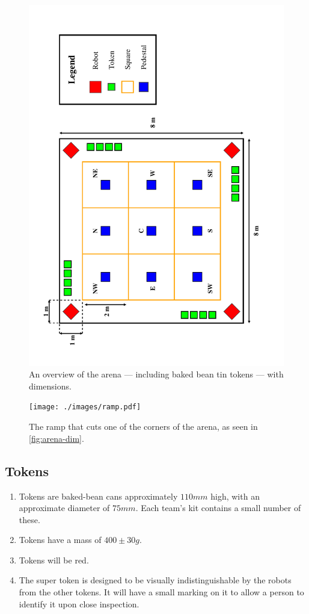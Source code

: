 \begin{figure}
  \includegraphics[keepaspectratio, clip, width=\textwidth]{./images/arena.pdf}
  \caption{\label{fig:arena-dim}An overview of the arena --- including baked bean tin tokens --- with dimensions.}
\end{figure}

\begin{figure}
  \begin{center}
    \texttt{[image: ./images/ramp.pdf]}
  \end{center}
  \caption{\label{fig:ramp-on-its-own}The ramp that cuts one of the corners of the arena, as seen in \autoref{fig:arena-dim}.}
\end{figure}

\subsection{Tokens}
\label{sub:Tokens}
\begin {enumerate}
\item Tokens are baked-bean cans approximately $110mm$ high, with an approximate diameter of $75mm$.
 Each team's kit contains a small number of these.
\item Tokens have a mass of $400\pm30g$.
\item Tokens will be red.
\item The super token is designed to be visually indistinguishable by the robots from the other tokens.  It will have a small marking on it to allow a person to identify it upon close inspection.
\end {enumerate}

